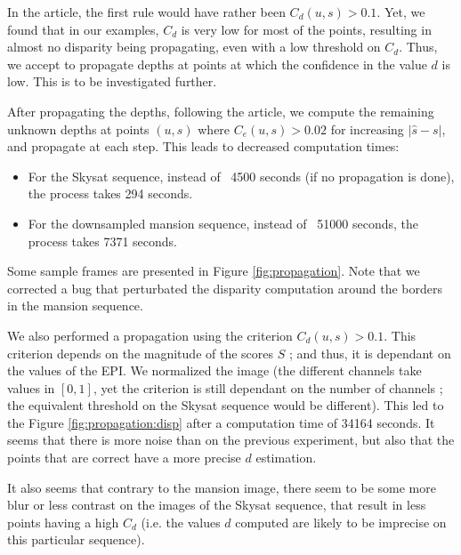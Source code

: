 \documentclass{article}
\newcommand{\abs} [1] {\left| #1 \right|}
\theoremstyle{definition}
\begin{document}
In the article, the first rule would have rather been $C_d(u, s) > 0.1$. Yet, we found that in our examples, $C_d$ is very low for most of the points, resulting in almost no disparity being propagating, even with a low threshold on $C_d$. Thus, we accept to propagate depths at points at which the confidence in the value $d$ is low. This is to be investigated further.


After propagating the depths, following the article, we compute the remaining unknown depths at points $(u, s)$ where $C_e(u, s) > 0.02$ for increasing $\abs{\widehat{s} - s}$, and propagate at each step. This leads to decreased computation times:
\begin{itemize}
 \item For the Skysat sequence, instead of ~4500 seconds (if no propagation is done), the process takes 294 seconds.
 \item For the downsampled mansion sequence, instead of ~51000 seconds, the process takes 7371 seconds.
\end{itemize}


Some sample frames are presented in Figure \ref{fig:propagation}. Note that we corrected a bug that perturbated the disparity computation around the borders in the mansion sequence.


We also performed a propagation using the criterion $C_d(u, s) > 0.1$. This criterion depends on the magnitude of the scores $S$ ; and thus, it is dependant on the values of the EPI. We normalized the image (the different channels take values in $[0, 1]$, yet the criterion is still dependant on the number of channels ; the equivalent threshold on the Skysat sequence would be different). This led to the Figure \ref{fig:propagation:disp} after a computation time of 34164 seconds. It seems that there is more noise than on the previous experiment, but also that the points that are correct have a more precise $d$ estimation.


It also seems that contrary to the mansion image, there seem to be some more blur or less contrast on the images of the Skysat sequence, that result in less points having a high $C_d$ (i.e. the values $d$ computed are likely to be imprecise on this particular sequence).
\end{document}
